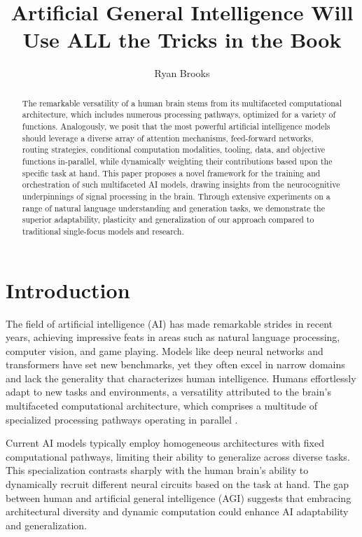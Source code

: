 \documentclass{article}
\begin{document}
\title{Artificial General Intelligence Will Use ALL the Tricks in the Book}
\author{Ryan Brooks}
\date{}

\maketitle

\begin{abstract}
    The remarkable versatility of a human brain stems from its multifaceted computational architecture, which includes numerous processing pathways, optimized for a variety of functions. Analogously, we posit that the most powerful artificial intelligence models should leverage a diverse array of attention mechanisms, feed-forward networks, routing strategies, conditional computation modalities, tooling, data, and objective functions in-parallel, while dynamically weighting their contributions based upon the specific task at hand. This paper proposes a novel framework for the training and orchestration of such multifaceted AI models, drawing insights from the neurocognitive underpinnings of signal processing in the brain. Through extensive experiments on a range of natural language understanding and generation tasks, we demonstrate the superior adaptability, plasticity and generalization of our approach compared to traditional single-focus models and research.
\end{abstract}

\section{Introduction}

The field of artificial intelligence (AI) has made remarkable strides in recent years, achieving impressive feats in areas such as natural language processing, computer vision, and game playing. Models like deep neural networks and transformers have set new benchmarks, yet they often excel in narrow domains and lack the generality that characterizes human intelligence. Humans effortlessly adapt to new tasks and environments, a versatility attributed to the brain's multifaceted computational architecture, which comprises a multitude of specialized processing pathways operating in parallel \cite{vaswani2017attention}.

Current AI models typically employ homogeneous architectures with fixed computational pathways, limiting their ability to generalize across diverse tasks. This specialization contrasts sharply with the human brain's ability to dynamically recruit different neural circuits based on the task at hand. The gap between human and artificial general intelligence (AGI) suggests that embracing architectural diversity and dynamic computation could enhance AI adaptability and generalization.
\end{document}
